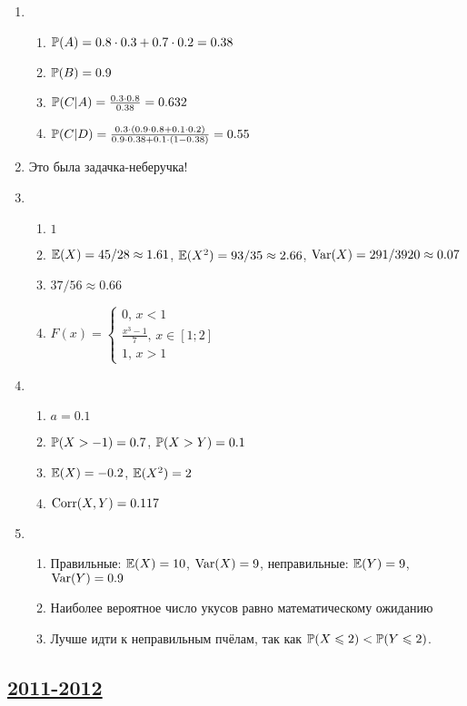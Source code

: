 \begin{enumerate}
\item
\begin{enumerate}
\item $\P(A)=0.8\cdot 0.3+0.7\cdot 0.2=0.38$
\item $\P(B)=0.9$
\item $\P(C|A)=\frac{0.3\cdot 0.8}{0.38}=0.632$
\item $\P(C|D)=\frac{0.3\cdot (0.9\cdot 0.8+0.1\cdot 0.2)}{0.9\cdot 0.38+0.1\cdot (1-0.38)}=0.55$
\end{enumerate}
\item Это была задачка-неберучка!
\item
\begin{enumerate}
\item $1$
\item $\E(X)=45/28\approx 1.61$, $\E(X^2)=93/35\approx 2.66$, $\Var(X)=291/3920\approx 0.07$
\item $37/56\approx 0.66$
\item $F(x)=\begin{cases} 0,\, x<1 \\
\frac{x^3-1}{7},\, x\in [1;2] \\
1,\, x>1 \end{cases}$
\end{enumerate}
\item
\begin{enumerate}
\item $a=0.1$
\item $\P(X>-1)=0.7$, $\P(X>Y)=0.1$
\item $\E(X)=-0.2$, $\E(X^2)=2$
\item $\Corr(X,Y)=0.117$
\end{enumerate}
\item
\begin{enumerate}
\item Правильные: $\E(X)=10$, $\Var(X)=9$, неправильные: $\E(Y)=9$, $\Var(Y)=0.9$
\item Наиболее вероятное число укусов равно математическому ожиданию
\item Лучше идти к неправильным пчёлам, так как $\P(X\leq 2)<\P(Y\leq 2)$.
\end{enumerate}
\end{enumerate}


\subsection[2011-2012]{\hyperref[sec:kr_01_2011_2012]{2011-2012}}
\label{sec:sol_kr_01_2011_2012}

